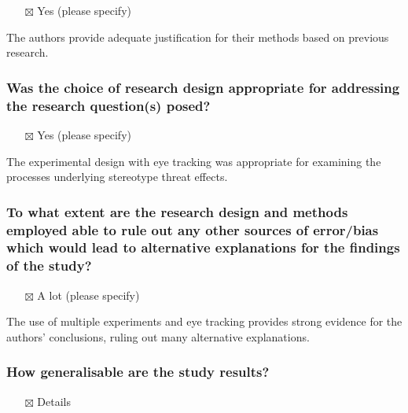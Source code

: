 \documentclass[
  doc, a4paper]{apa7}
\providecommand{\tightlist}{%
  \setlength{\itemsep}{0pt}\setlength{\parskip}{0pt}}
\begin{document}
\begin{itemize}
\tightlist
\item[$\boxtimes$]
  Yes (please specify)
\end{itemize}

The authors provide adequate justification for their methods based on previous research.

\subsubsection{Was the choice of research design appropriate for addressing the research question(s) posed?}\label{was-the-choice-of-research-design-appropriate-for-addressing-the-research-questions-posed}

\begin{itemize}
\tightlist
\item[$\boxtimes$]
  Yes (please specify)
\end{itemize}

The experimental design with eye tracking was appropriate for examining the processes underlying stereotype threat effects.

\subsubsection{To what extent are the research design and methods employed able to rule out any other sources of error/bias which would lead to alternative explanations for the findings of the study?}\label{to-what-extent-are-the-research-design-and-methods-employed-able-to-rule-out-any-other-sources-of-errorbias-which-would-lead-to-alternative-explanations-for-the-findings-of-the-study}

\begin{itemize}
\tightlist
\item[$\boxtimes$]
  A lot (please specify)
\end{itemize}

The use of multiple experiments and eye tracking provides strong evidence for the authors' conclusions, ruling out many alternative explanations.

\subsubsection{How generalisable are the study results?}\label{how-generalisable-are-the-study-results}

\begin{itemize}
\tightlist
\item[$\boxtimes$]
  Details
\end{itemize}
\end{document}
